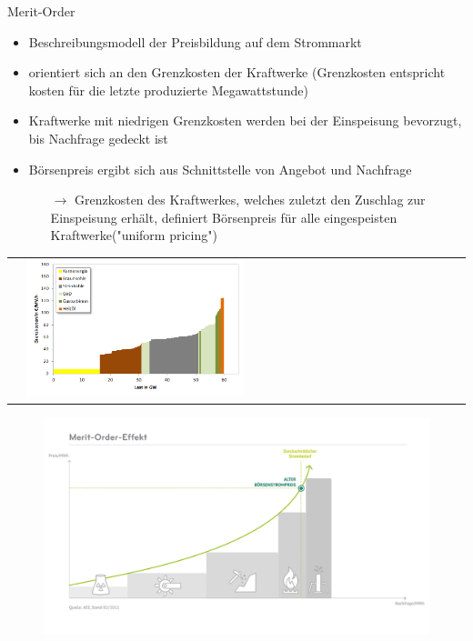 \documentclass[aspectratio=1610, professionalfonts, 9pt]{beamer}
\begin{document}
\begin{frame}{Merit-Order}
\begin{itemize}
  \item Beschreibungsmodell der Preisbildung auf dem Strommarkt
  \item orientiert sich an den Grenzkosten der Kraftwerke
  (Grenzkosten entspricht kosten für die letzte produzierte Megawattstunde)
\item Kraftwerke mit niedrigen Grenzkosten werden bei der
 Einspeisung bevorzugt, bis Nachfrage gedeckt ist
\item Börsenpreis ergibt sich aus Schnittstelle von Angebot und Nachfrage
\begin{itemize}
  \item[$\rightarrow$] Grenzkosten des Kraftwerkes, welches zuletzt den
  Zuschlag zur Einspeisung erhält, definiert Börsenpreis für alle eingespeisten Kraftwerke("uniform pricing")
\end{itemize}
\end{itemize}
\begin{tabular}{p{}p{}}
&
\includegraphics[width=0.5\textwidth]{images/Merit_Order_2008.PNG}
\\
\end{tabular}
\end{frame}

\begin{frame}
  \begin{figure}
  \includegraphics[width=1\textwidth]{images/Meritorder.png}
\end{figure}
\end{frame}
\end{document}
